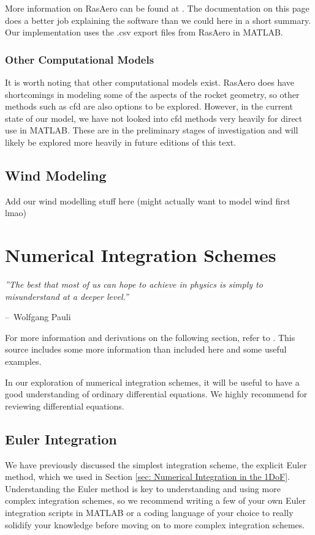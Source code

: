 \documentclass[12pt]{report}
\makeatletter
\newenvironment{chapquote}[2][2em]
  {\setlength{\@tempdima}{#1}%
   \def\chapquote@author{#2}%
   \parshape 1 \@tempdima \dimexpr\textwidth-2\@tempdima\relax%
   \itshape}
  {\par\normalfont\hfill--\ \chapquote@author\hspace*{\@tempdima}\par\bigskip}
\makeatother
\begin{document}
More information on RasAero can be found at \cite{rogers_rasaero_2019}. The documentation on this page does a better job explaining the software than we could here in a short summary. Our implementation uses the .csv export files from RasAero in MATLAB.
\subsection{Other Computational Models}
It is worth noting that other computational models exist. RasAero does have shortcomings in modeling some of the aspects of the rocket geometry, so other methods such as \gls{cfd} are also options to be explored. However, in the current state of our model, we have not looked into \gls{cfd} methods very heavily for direct use in MATLAB. These are in the preliminary stages of investigation and will likely be explored more heavily in future editions of this text.
\section{Wind Modeling}
Add our wind modelling stuff here (might actually want to model wind first lmao)

\chapter{Numerical Integration Schemes}\label{sec:numerical integration schemes}

\begin{chapquote}{Wolfgang Pauli}
    ''The best that most of us can hope to achieve in physics is simply to misunderstand at a deeper level.''
\end{chapquote}
For more information and derivations on the following section, refer to \cite{trench_31_2020}. This source includes some more information than included here and some useful examples.

In our exploration of numerical integration schemes, it will be useful to have a good understanding of ordinary differential equations. We highly recommend \cite{dawkins_differential_2023} for reviewing differential equations.

\section{Euler Integration}\label{sec:euler integration}
We have previously discussed the simplest integration scheme, the explicit Euler method, which we used in Section \ref{sec: Numerical Integration in the 1DoF}. Understanding the Euler method is key to understanding and using more complex integration schemes, so we recommend writing a few of your own Euler integration scripts in MATLAB or a coding language of your choice to really solidify your knowledge before moving on to more complex integration schemes. 
\end{document}
